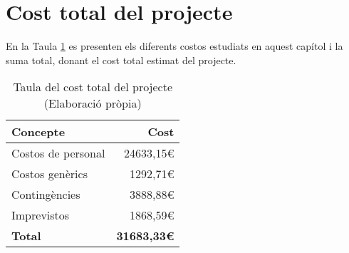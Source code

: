 \section{Cost total del projecte}
En la Taula \ref{tab:cost_total} es presenten els diferents costos estudiats en aquest capítol i la suma total, donant el cost total estimat del projecte.

\begin{table}[H]
    \centering
    \begin{tabular}{l|r}
         \textbf{Concepte} & \textbf{Cost} \\
    \hline
         Costos de personal  &  24633,15\euro \\
         Costos genèrics     &  1292,71\euro \\
         Contingències       &  3888,88\euro \\
         Imprevistos         &  1868,59\euro \\
     \hline
         \textbf{Total} & \textbf{31683,33\euro} \\
    \end{tabular}
    \caption[Cost total del projecte]{Taula del cost total del projecte \\ (Elaboració pròpia)}
    \label{tab:cost_total}
\end{table}
